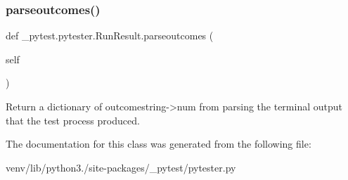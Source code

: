 \subsubsection{\texorpdfstring{parseoutcomes()}{parseoutcomes()}}
{\footnotesize\ttfamily def \+\_\+pytest.\+pytester.\+Run\+Result.\+parseoutcomes (\begin{DoxyParamCaption}\item[{}]{self }\end{DoxyParamCaption})}

\begin{DoxyVerb}Return a dictionary of outcomestring->num from parsing the terminal
output that the test process produced.\end{DoxyVerb}
 

The documentation for this class was generated from the following file\+:\begin{DoxyCompactItemize}
\item 
venv/lib/python3./site-\/packages/\+\_\+pytest/pytester.\+py\end{DoxyCompactItemize}
